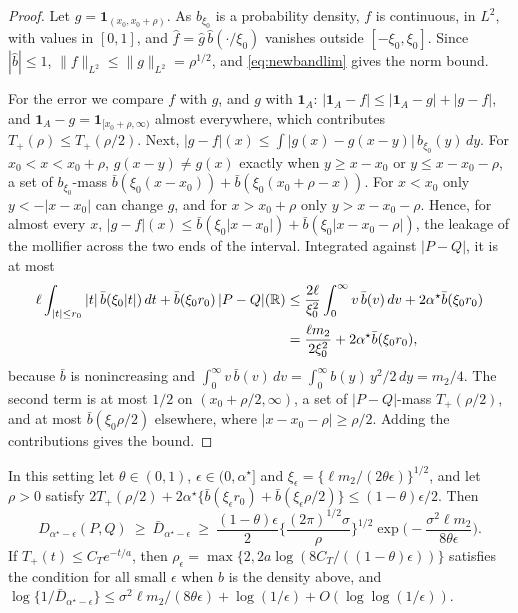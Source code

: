 \begin{proof}
Let $g=\mathbf 1_{(x_0,x_0+\rho)}$. As $b_{\xi_0}$ is a probability density, $f$ is continuous, in $L^2$, with
values in $[0,1]$, and $\widehat f=\widehat g\,\widehat b(\cdot/\xi_0)$ vanishes outside $[-\xi_0,\xi_0]$. Since $|\widehat b|\le1$,
$\|f\|_{L^2}\le\|g\|_{L^2}=\rho^{1/2}$, and \eqref{eq:newbandlim} gives the norm bound.

For the error we compare $f$ with $g$, and $g$ with $\mathbf 1_A$: $|\mathbf 1_A-f|\le|\mathbf 1_A-g|+|g-f|$, and $\mathbf 1_A-g=\mathbf 1_{[x_0+\rho,\infty)}$ almost everywhere, which
contributes $T_+(\rho)\le T_+(\rho/2)$. Next, $|g-f|(x)\le\int|g(x)-g(x-y)|\,b_{\xi_0}(y)\,dy$. For $x_0<x<x_0+\rho$, $g(x-y)\neq g(x)$
exactly when $y\ge x-x_0$ or $y\le x-x_0-\rho$, a set of $b_{\xi_0}$-mass $\bar b(\xi_0(x-x_0))+\bar b(\xi_0(x_0+\rho-x))$. For
$x<x_0$ only $y<-|x-x_0|$ can change $g$, and for $x>x_0+\rho$ only $y>x-x_0-\rho$. Hence, for almost every $x$, $|g-f|(x)\le\bar b(\xi_0|x-x_0|)+\bar b(\xi_0|x-x_0-\rho|)$, the leakage of the mollifier across the two ends of the interval. Integrated against $|P-Q|$, it is at most
\begin{align*}
\ell\int_{|t|\le r_0}|t|\,\bar b(\xi_0|t|)\,dt+\bar b(\xi_0 r_0)\,|P-Q|(\mathbb{R})
&\le\frac{2\ell}{\xi_0^2}\int_0^\infty v\,\bar b(v)\,dv+2\alpha^\star\bar b(\xi_0 r_0)\\
&=\frac{\ell m_2}{2\xi_0^2}+2\alpha^\star\bar b(\xi_0 r_0),
\end{align*}
because $\bar b$ is nonincreasing and $\int_0^\infty v\,\bar b(v)\,dv=\int_0^\infty b(y)\,y^2/2\,dy=m_2/4$. The second term is at most
$1/2$ on $(x_0+\rho/2,\infty)$, a set of $|P-Q|$-mass $T_+(\rho/2)$, and at most $\bar b(\xi_0\rho/2)$ elsewhere, where
$|x-x_0-\rho|\ge\rho/2$. Adding the contributions gives the bound.
\end{proof}

\begin{theorem}
\label{thm:newgauss}
In this setting let $\theta\in(0,1)$, $\epsilon\in(0,\alpha^\star]$ and $\xi_\epsilon=\{\ell m_2/(2\theta\epsilon)\}^{1/2}$, and let
$\rho>0$ satisfy $2T_+(\rho/2)+2\alpha^\star\{\bar b(\xi_\epsilon r_0)+\bar b(\xi_\epsilon\rho/2)\}\le(1-\theta)\epsilon/2$. Then
\[
D_{\alpha^\star-\epsilon}(P,Q)\ \ge\ \bar D_{\alpha^\star-\epsilon}\ \ge\ \frac{(1-\theta)\epsilon}2\Big\{\frac{(2\pi)^{1/2}\sigma}{\rho}\Big\}^{1/2}
\exp\Big(-\frac{\sigma^2\ell m_2}{8\theta\epsilon}\Big) .
\]
If $T_+(t)\le C_Te^{-t/a}$, then $\rho_\epsilon=\max\{2,2a\log(8C_T/((1-\theta)\epsilon))\}$ satisfies the condition for all small
$\epsilon$ when $b$ is the density above, and $\log\{1/\bar D_{\alpha^\star-\epsilon}\}\le\sigma^2\ell m_2/(8\theta\epsilon)+\log(1/\epsilon)+O(\log\log(1/\epsilon))$.
\end{theorem}

